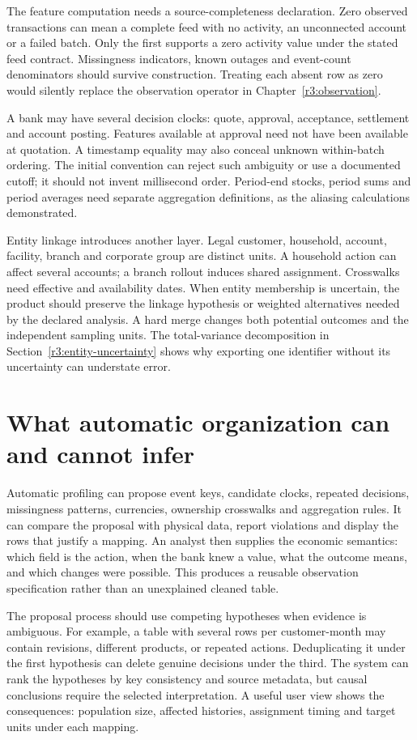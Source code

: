 The feature computation needs a source-completeness declaration. Zero
observed transactions can mean a complete feed with no activity, an
unconnected account or a failed batch. Only the first supports a zero
activity value under the stated feed contract. Missingness indicators,
known outages and event-count denominators should survive construction.
Treating each absent row as zero would silently replace the observation
operator in Chapter~\ref{r3:observation}.

A bank may have several decision clocks: quote, approval, acceptance,
settlement and account posting. Features available at approval need not
have been available at quotation. A timestamp equality may also conceal
unknown within-batch ordering. The initial convention can reject such
ambiguity or use a documented cutoff; it should not invent millisecond
order. Period-end stocks, period sums and period averages need separate
aggregation definitions, as the aliasing calculations demonstrated.

Entity linkage introduces another layer. Legal customer, household,
account, facility, branch and corporate group are distinct units. A
household action can affect several accounts; a branch rollout induces
shared assignment. Crosswalks need effective and availability dates.
When entity membership is uncertain, the product should preserve the
linkage hypothesis or weighted alternatives needed by the declared
analysis. A hard merge changes both potential outcomes and the
independent sampling units. The total-variance decomposition in
Section~\ref{r3:entity-uncertainty} shows why exporting one identifier
without its uncertainty can understate error.

\section{What automatic organization can and cannot infer}
\label{r3:automatic-organization}

Automatic profiling can propose event keys, candidate clocks, repeated
decisions, missingness patterns, currencies, ownership crosswalks and
aggregation rules. It can compare the proposal with physical data,
report violations and display the rows that justify a mapping.
An analyst then supplies the economic semantics: which field is the
action, when the bank knew a value, what the outcome means, and which
changes were possible. This produces a reusable observation specification
rather than an unexplained cleaned table.

The proposal process should use competing hypotheses when evidence is
ambiguous. For example, a table with several rows per customer-month may
contain revisions, different products, or repeated actions. Deduplicating
it under the first hypothesis can delete genuine decisions under the
third. The system can rank the hypotheses by key consistency and source
metadata, but causal conclusions require the selected interpretation.
A useful user view shows the consequences: population size, affected
histories, assignment timing and target units under each mapping.

